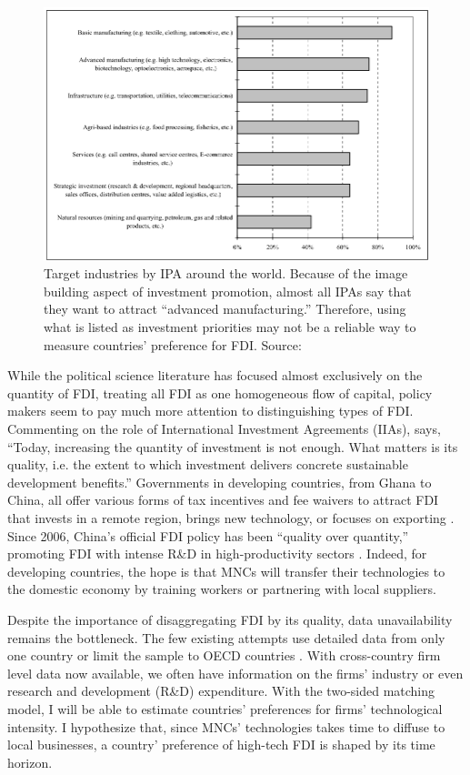 \begin{figure}[!ht] \centering
\includegraphics[width=\textwidth,keepaspectratio]{../figure/IPA_target_industries}
  \caption{Target industries by IPA around the world. Because of the image
building aspect of investment promotion, almost all IPAs say that they want to
attract ``advanced manufacturing.'' Therefore, using what is listed as
investment priorities may not be a reliable way to measure countries' preference
for FDI. Source: \citet{UNCTAD2001}}
  \label{fig:IPA_target_industries}
\end{figure}

While the political science literature has focused almost exclusively on the
quantity of FDI, treating all FDI as one homogeneous flow of capital, policy
makers seem to pay much more attention to distinguishing types of FDI.
Commenting on the role of International Investment Agreements (IIAs),
\citet{UNCTAD2015} says, ``Today, increasing the quantity of investment is not
enough. What matters is its quality, i.e. the extent to which investment
delivers concrete sustainable development benefits.'' Governments in developing
countries, from Ghana to China, all offer various forms of tax incentives and
fee waivers to attract FDI that invests in a remote region, brings new
technology, or focuses on exporting \citep{Ricupero2000}. Since 2006, China's
official FDI policy has been ``quality over quantity,'' promoting FDI with
intense R\&D in high-productivity sectors \citep{Guangzhou2011}. Indeed, for
developing countries, the hope is that MNCs will transfer their technologies to
the domestic economy by training workers or partnering with local suppliers.

Despite the importance of disaggregating FDI by its quality, data unavailability
remains the bottleneck. The few existing attempts use detailed data from only
one country or limit the sample to OECD countries \citep{Alfaro2003, Alfaro2007,
Javorcik2004}. With cross-country firm level data now available, we often have
information on the firms' industry or even research and development (R\&D)
expenditure. With the two-sided matching model, I will be able to estimate
countries' preferences for firms' technological intensity. I hypothesize that,
since MNCs' technologies takes time to diffuse to local businesses, a country'
preference of high-tech FDI is shaped by its time horizon.

